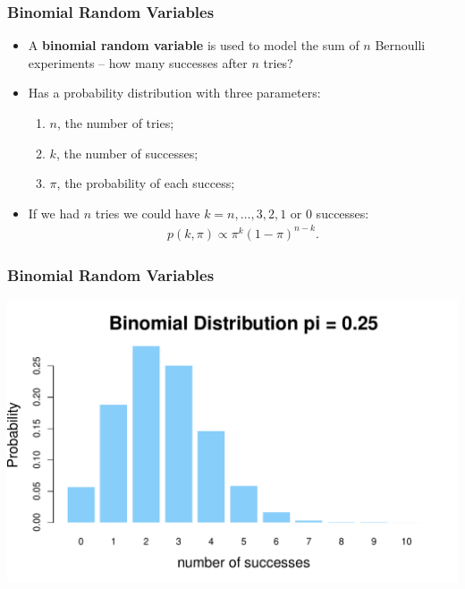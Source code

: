 \documentclass[aspectratio=169]{beamer}
\theoremstyle{principle}
\begin{document}
\begin{frame}
\frametitle{Binomial Random Variables}

\begin{itemize}
\item A \textbf{binomial random variable} is used to model the sum of $n$ Bernoulli experiments -- how many successes after $n$ tries?
\bigskip

\item Has a probability distribution with three parameters:
\begin{enumerate}
\item $n$, the number of tries;
\item $k$, the number of successes;
\item $\pi$, the probability of each success;
\end{enumerate}
\bigskip

\item If we had $n$ tries we could have $k=n,\hdots,3,2,1$ or $0$ successes:
\begin{align*}
p(k,\pi) \propto \pi^k(1-\pi)^{n-k}.
\end{align*}

\end{itemize}

\end{frame}

\begin{frame}
\frametitle{Binomial Random Variables}

\begin{center}
\includegraphics[scale=0.5]{binomial_25.pdf}
\end{center}

\end{frame}
\end{document}
